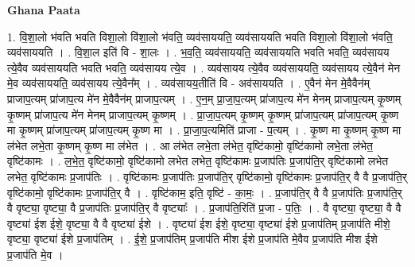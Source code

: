 \documentclass[17pt]{extarticle}
\begin{document}
\textbf{Ghana Paata } \newline

1. वि॒शा॒लो भ॑वति भवति विशा॒लो वि॑शा॒लो भ॑वति॒ व्यव॑साययति॒ व्यव॑साययति भवति विशा॒लो वि॑शा॒लो भ॑वति॒ व्यव॑साययति । . वि॒शा॒ल इति॑ वि - शा॒लः । . भ॒व॒ति॒ व्यव॑साययति॒ व्यव॑साययति भवति भवति॒ व्यव॑सायय त्ये॒वैव व्यव॑साययति भवति भवति॒ व्यव॑सायय त्ये॒व । . व्यव॑सायय त्ये॒वैव व्यव॑साययति॒ व्यव॑सायय त्ये॒वैन॑ मेन मे॒व व्यव॑साययति॒ व्यव॑सायय त्ये॒वैन᳚म् । . व्यव॑सायय॒तीति॑ वि - अव॑साययति । . ए॒वैन॑ मेन मे॒वैवैन॑म् प्राजाप॒त्यम् प्रा॑जाप॒त्य मे॑न मे॒वैवैन॑म् प्राजाप॒त्यम् । . ए॒न॒म् प्रा॒जा॒प॒त्यम् प्रा॑जाप॒त्य मे॑न मेनम् प्राजाप॒त्यम् कृ॒ष्णम् कृ॒ष्णम् प्रा॑जाप॒त्य मे॑न मेनम् प्राजाप॒त्यम् कृ॒ष्णम् । . प्रा॒जा॒प॒त्यम् कृ॒ष्णम् कृ॒ष्णम् प्रा॑जाप॒त्यम् प्रा॑जाप॒त्यम् कृ॒ष्ण मा कृ॒ष्णम् प्रा॑जाप॒त्यम् प्रा॑जाप॒त्यम् कृ॒ष्ण मा । . प्रा॒जा॒प॒त्यमिति॑ प्राजा - प॒त्यम् । . कृ॒ष्ण मा कृ॒ष्णम् कृ॒ष्ण मा ल॑भेत लभे॒ता कृ॒ष्णम् कृ॒ष्ण मा ल॑भेत । . आ ल॑भेत लभे॒ता ल॑भेत॒ वृष्टि॑कामो॒ वृष्टि॑कामो लभे॒ता ल॑भेत॒ वृष्टि॑कामः । . ल॒भे॒त॒ वृष्टि॑कामो॒ वृष्टि॑कामो लभेत लभेत॒ वृष्टि॑कामः प्र॒जाप॑तिः प्र॒जाप॑ति॒र् वृष्टि॑कामो लभेत लभेत॒ वृष्टि॑कामः प्र॒जाप॑तिः । . वृष्टि॑कामः प्र॒जाप॑तिः प्र॒जाप॑ति॒र् वृष्टि॑कामो॒ वृष्टि॑कामः प्र॒जाप॑ति॒र् वै वै प्र॒जाप॑ति॒र् वृष्टि॑कामो॒ वृष्टि॑कामः प्र॒जाप॑ति॒र् वै । . वृष्टि॑काम॒ इति॒ वृष्टि॑ - का॒मः॒ । . प्र॒जाप॑ति॒र् वै वै प्र॒जाप॑तिः प्र॒जाप॑ति॒र् वै वृष्ट्या॒ वृष्ट्या॒ वै प्र॒जाप॑तिः प्र॒जाप॑ति॒र् वै वृष्ट्याः᳚ । . प्र॒जाप॑ति॒रिति॑ प्र॒जा - प॒तिः॒ । . वै वृष्ट्या॒ वृष्ट्या॒ वै वै वृष्ट्या॑ ईश ईशे॒ वृष्ट्या॒ वै वै वृष्ट्या॑ ईशे । . वृष्ट्या॑ ईश ईशे॒ वृष्ट्या॒ वृष्ट्या॑ ईशे प्र॒जाप॑तिम् प्र॒जाप॑ति मीशे॒ वृष्ट्या॒ वृष्ट्या॑ ईशे प्र॒जाप॑तिम् । . ई॒शे॒ प्र॒जाप॑तिम् प्र॒जाप॑ति मीश ईशे प्र॒जाप॑ति मे॒वैव प्र॒जाप॑ति मीश ईशे प्र॒जाप॑ति मे॒व । \newline
\end{document}
